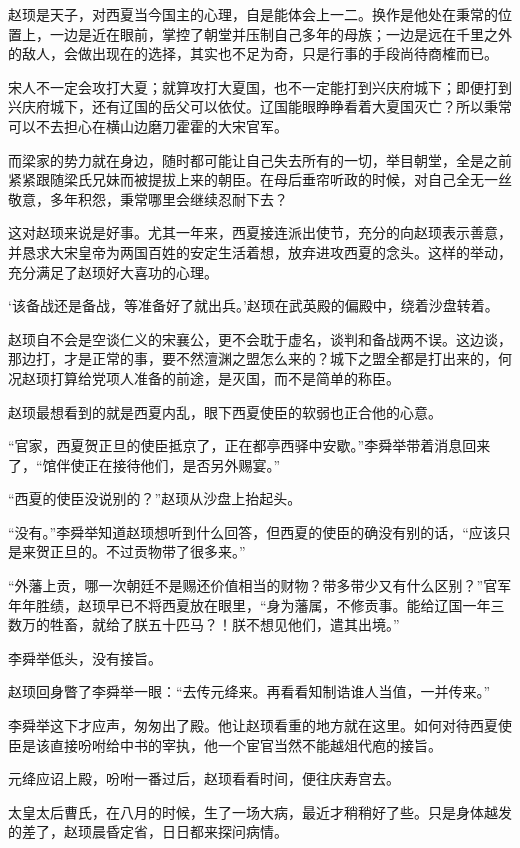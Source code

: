 赵顼是天子，对西夏当今国主的心理，自是能体会上一二。换作是他处在秉常的位置上，一边是近在眼前，掌控了朝堂并压制自己多年的母族；一边是远在千里之外的敌人，会做出现在的选择，其实也不足为奇，只是行事的手段尚待商榷而已。

宋人不一定会攻打大夏；就算攻打大夏国，也不一定能打到兴庆府城下；即便打到兴庆府城下，还有辽国的岳父可以依仗。辽国能眼睁睁看着大夏国灭亡？所以秉常可以不去担心在横山边磨刀霍霍的大宋官军。

而梁家的势力就在身边，随时都可能让自己失去所有的一切，举目朝堂，全是之前紧紧跟随梁氏兄妹而被提拔上来的朝臣。在母后垂帘听政的时候，对自己全无一丝敬意，多年积怨，秉常哪里会继续忍耐下去？

这对赵顼来说是好事。尤其一年来，西夏接连派出使节，充分的向赵顼表示善意，并恳求大宋皇帝为两国百姓的安定生活着想，放弃进攻西夏的念头。这样的举动，充分满足了赵顼好大喜功的心理。

‘该备战还是备战，等准备好了就出兵。’赵顼在武英殿的偏殿中，绕着沙盘转着。

赵顼自不会是空谈仁义的宋襄公，更不会耽于虚名，谈判和备战两不误。这边谈，那边打，才是正常的事，要不然澶渊之盟怎么来的？城下之盟全都是打出来的，何况赵顼打算给党项人准备的前途，是灭国，而不是简单的称臣。

赵顼最想看到的就是西夏内乱，眼下西夏使臣的软弱也正合他的心意。

“官家，西夏贺正旦的使臣抵京了，正在都亭西驿中安歇。”李舜举带着消息回来了，“馆伴使正在接待他们，是否另外赐宴。”

“西夏的使臣没说别的？”赵顼从沙盘上抬起头。

“没有。”李舜举知道赵顼想听到什么回答，但西夏的使臣的确没有别的话，“应该只是来贺正旦的。不过贡物带了很多来。”

“外藩上贡，哪一次朝廷不是赐还价值相当的财物？带多带少又有什么区别？”官军年年胜绩，赵顼早已不将西夏放在眼里，“身为藩属，不修贡事。能给辽国一年三数万的牲畜，就给了朕五十匹马？！朕不想见他们，遣其出境。”

李舜举低头，没有接旨。

赵顼回身瞥了李舜举一眼：“去传元绛来。再看看知制诰谁人当值，一并传来。”

李舜举这下才应声，匆匆出了殿。他让赵顼看重的地方就在这里。如何对待西夏使臣是该直接吩咐给中书的宰执，他一个宦官当然不能越俎代庖的接旨。

元绛应诏上殿，吩咐一番过后，赵顼看看时间，便往庆寿宫去。

太皇太后曹氏，在八月的时候，生了一场大病，最近才稍稍好了些。只是身体越发的差了，赵顼晨昏定省，日日都来探问病情。

